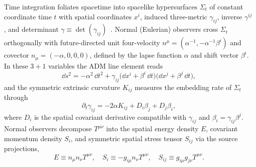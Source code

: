 Time integration foliates spacetime into spacelike hypersurfaces $\Sigma_t$ of constant coordinate time $t$ with spatial coordinates $x^i$, induced three-metric $\gamma_{ij}$, inverse $\gamma^{ij}$, and determinant $\gamma \equiv \det(\gamma_{ij})$~\cite{Arnowitt:1962hi}. Normal (Eulerian) observers cross $\Sigma_t$ orthogonally with future-directed unit four-velocity $n^\mu = (\alpha^{-1}, -\alpha^{-1}\beta^i)$ and covector $n_\mu = (-\alpha, 0, 0, 0)$, defined by the lapse function $\alpha$ and shift vector $\beta^i$. In these $3+1$ variables the ADM line element reads
\begin{equation}\label{eq:adm_metric}
\dd s^2 = -\alpha^2\,\dd t^2 + \gamma_{ij}\bigl(\dd x^i + \beta^i\,\dd t\bigr)\bigl(\dd x^j + \beta^j\,\dd t\bigr),
\end{equation}
and the symmetric extrinsic curvature $K_{ij}$ measures the embedding rate of $\Sigma_t$ through
\begin{equation}\label{eq:extrinsic_curvature}
\partial_t \gamma_{ij} = -2\alpha K_{ij} + D_i \beta_j + D_j \beta_i,
\end{equation}
where $D_i$ is the spatial covariant derivative compatible with $\gamma_{ij}$ and $\beta_i = \gamma_{ij}\beta^j$. Normal observers decompose $T^{\mu\nu}$ into the spatial energy density $E$, covariant momentum density $S_i$, and symmetric spatial stress tensor $S_{ij}$ via the source projections,
\begin{equation}\label{eq:source_projections}
E \equiv n_\mu n_\nu T^{\mu\nu}, \quad
S_i \equiv -g_{i\mu} n_\nu T^{\mu\nu}, \quad
S_{ij} \equiv g_{i\mu} g_{j\nu} T^{\mu\nu}.
\end{equation}

